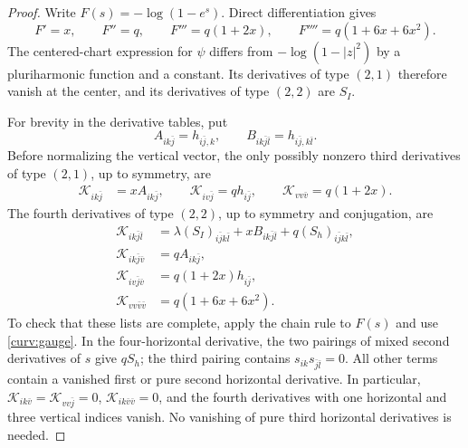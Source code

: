 \begin{proof}
Write $F(s)=-\log(1-e^s)$.  Direct differentiation gives
\[
 F'=x,\qquad F''=q,\qquad F'''=q(1+2x),\qquad
 F''''=q(1+6x+6x^2).
\]
The centered-chart expression for $\psi$ differs from
$-\log(1-|z|^2)$ by a pluriharmonic function and a constant.
Its derivatives of type $(2,1)$ therefore vanish at the center,
and its derivatives of type $(2,2)$ are $S_I$.

For brevity in the derivative tables, put
\[
 A_{ik\bar j}=h_{i\bar j,k},\qquad
 B_{ik\bar j\bar l}=h_{i\bar j,k\bar l}.
\]
Before normalizing the vertical vector, the only possibly nonzero
third derivatives of type $(2,1)$, up to symmetry, are
\begin{equation}\label{curv:third-derivatives}
 \begin{aligned}
 \mathcal K_{ik\bar j}&=xA_{ik\bar j},\qquad
 \mathcal K_{iv\bar j}=qh_{i\bar j},\qquad
 \mathcal K_{vv\bar v}=q(1+2x).
 \end{aligned}
\end{equation}
The fourth derivatives of type $(2,2)$, up to symmetry and
conjugation, are
\begin{equation}\label{curv:fourth-derivatives}
 \begin{aligned}
 \mathcal K_{ik\bar j\bar l}
   &=\lambda(S_I)_{i\bar j k\bar l}
       +xB_{ik\bar j\bar l}+q(S_h)_{i\bar j k\bar l},\\
 \mathcal K_{ik\bar j\bar v}&=qA_{ik\bar j},\\
 \mathcal K_{iv\bar j\bar v}&=q(1+2x)h_{i\bar j},\\
 \mathcal K_{vv\bar v\bar v}&=q(1+6x+6x^2).
 \end{aligned}
\end{equation}
To check that these lists are complete, apply the chain rule to
$F(s)$ and use \eqref{curv:gauge}.  In the four-horizontal
derivative, the two pairings of mixed second derivatives of $s$
give $qS_h$; the third pairing contains
$s_{ik}s_{\bar j\bar l}=0$.  All other terms contain a vanished
first or pure second horizontal derivative.  In particular,
$\mathcal K_{ik\bar v}=\mathcal K_{vv\bar j}=0$,
$\mathcal K_{ik\bar v\bar v}=0$, and the fourth derivatives
with one horizontal and three vertical indices vanish.
No vanishing of pure third horizontal derivatives is needed.


\end{proof}

